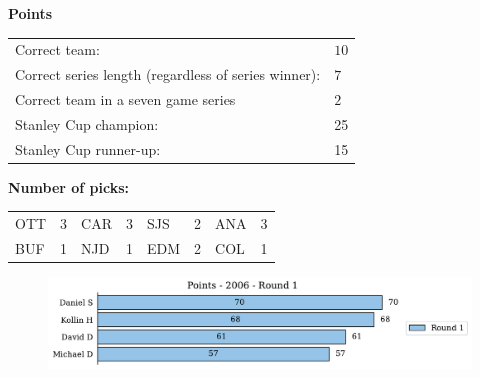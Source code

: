 \documentclass[10pt]{article}
\begin{document}
{\bf Points}\\
\begin{minipage}{12cm}
    \begin{tabular}{l l}
        Correct team:	& $10$\\
        Correct series length (regardless of series winner):	& $7$\\
        Correct team in a seven game series    & $2$\\
        Stanley Cup champion:	& 25\\
        Stanley Cup runner-up:	& 15\\
    \end{tabular}

    \vspace{1cm}
    {\bf Number of picks:}\\
    \begin{tabular}{lc | lc | lc | lc }
        OTT & 3 & CAR & 3 & SJS & 2 & ANA & 3 \\
        BUF & 1 & NJD & 1 & EDM & 2 & COL & 1 \\
    \end{tabular}
\end{minipage}
\begin{minipage}[t]{13cm}
    \begin{figure}[H]
        \vspace{-3.5cm}
        \includegraphics[width=12cm]{../../figures/2006/Points-2006-Round1.pdf}
    \end{figure}
\end{minipage}
\end{document}
